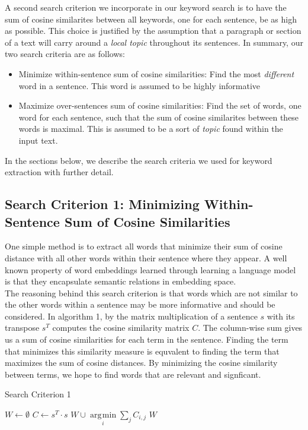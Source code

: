 \documentclass[12pt]{article}
\DeclareMathOperator*{\argmin}{\arg\!\min}
\begin{document}
A second search criterion we incorporate in our keyword search is to have the sum of cosine similarites between all keywords, one for each sentence,
be as high as possible. This choice is justified by the assumption that a paragraph or section of a text will carry around a \textit{local topic}
throughout its sentences. In summary, our two search criteria are as follows:

\begin{itemize}
  \item Minimize within-sentence sum of cosine similarities: Find the most \textit{different} word in a sentence. This word is assumed to be highly informative
  \item Maximize over-sentences sum of cosine similarities: Find the set of words, one word for each sentence, such that the sum of cosine similarites between these words is maximal. This is assumed to be a sort of \textit{topic} found within the input text.
\end{itemize}
In the sections below, we describe the search criteria we used for keyword extraction with further detail.

\subsection{Search Criterion 1: Minimizing Within-Sentence Sum of Cosine Similarities}
One simple method is to extract all words that minimize their sum of cosine distance with all other words within their sentence where they appear. A well known property of word embeddings learned through learning a language model is that they encapsulate semantic relations in embedding space. \\

The reasoning behind this search criterion is that words which are not similar to the other words within a sentence may be more informative and should be considered. In algorithm 1, by the matrix multiplication of a sentence $s$ with its transpose $s^T$ computes the cosine similarity matrix $C$. The column-wise sum gives us a sum of cosine similarities for each term in the sentence. Finding the term that minimizes this similarity measure is equvalent to finding the term that maximizes the sum of cosine distances. By minimizing the cosine similarity between terms, we hope to find words that are relevant and signficant.

\begin{algorithm}[H]
\caption{Search Criterion 1}\label{euclid}
\begin{algorithmic}[1]
\State $W \gets \emptyset $
\State $ C \gets s^ T \cdot s$
\State $ W \cup \argmin\limits_{i} \sum\limits_{j} C_{i,j}$
\State
\EndFor
\State \Return $W$
\EndProcedure
\end{algorithmic}
\end{algorithm}
\end{document}
